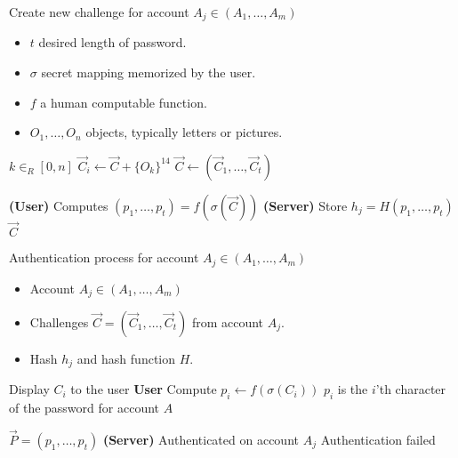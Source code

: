 \begin{algorithm}
    \caption{Create new challenge for account $A_j \in (A_1,\dots, A_m)$}
    \begin{algorithmic}[1]
        \Require
            \Statex \begin{itemize}
                \item $t$ desired length of password.
                \item $\sigma$ secret mapping memorized by the user.
                \item $f$ a human computable function.
                \item $O_1,\dots,O_n$ objects, typically letters or pictures.
            \end{itemize}
            
        
            \State $k \in_R [0, n] $
            \State $\vec C_i \leftarrow \vec C + \{O_k\}^{14} $
        \EndFor
        \Statex
        \State $\vec C \leftarrow (\vec C_1,\dots, \vec C_t) $

        \State \textbf{(User)} Computes $(p_1,\dots,p_t)=f(\sigma(\vec C))$
        \State \textbf{(Server)} Store $h_j = H(p_1,\dots,p_t)$
        \State
        \State \Ensure $\vec C$
    \end{algorithmic}
    \label{new-challenge-algo}
\end{algorithm}


\begin{algorithm}
    \caption{Authentication process for account $A_j \in (A_1,\dots,A_m)$}
    \begin{algorithmic}[1]
        \Require
            \Statex \begin{itemize}
                \item Account $A_j \in (A_1,\dots, A_m)$
                \item Challenges $\vec C = (\vec C_1,\dots,\vec C_t)$ from account $A_j$.
                \item Hash $h_j$ and hash function $H$.
            \end{itemize}

                \State Display $C_i$ to the user
                \State \textbf{User} Compute $p_i \leftarrow f(\sigma(C_i))$
                \State
                \Comment $p_i$ is the $i$'th character of the password for account $A$
            \EndFor

            \State $\vec P = (p_1,\dots,p_t)$
            \Comment \textbf{(Server)} 
                \State Authenticated on account $A_j$
            \Else 
                \State Authentication failed
            \EndIf

    \end{algorithmic}
    \label{auth-algo}
\end{algorithm}



